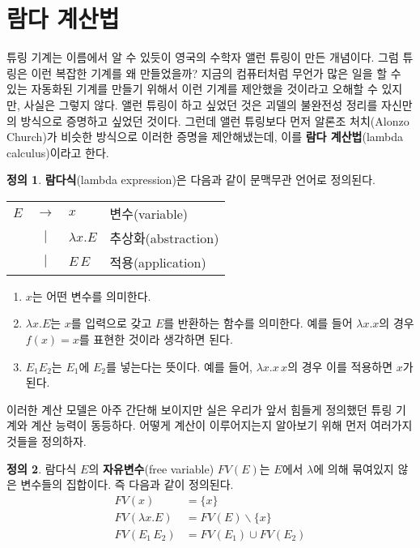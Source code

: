 \documentclass[b5paper, 11pt]{book}
\theoremstyle{definition}
\newtheorem{defn}{정의}[chapter]
\begin{document}
\section{람다 계산법}\label{lambda calculus}
튜링 기계는 이름에서 알 수 있듯이 영국의 수학자 앨런 튜링이 만든 개념이다. 그럼 튜링은 이런 복잡한 기계를 왜 만들었을까? 지금의 컴퓨터처럼 무언가 많은 일을 할 수 있는 자동화된 기계를 만들기 위해서 이런 기계를 제안했을 것이라고 오해할 수 있지만, 사실은 그렇지 않다. 앨런 튜링이 하고 싶었던 것은 괴델의 불완전성 정리를 자신만의 방식으로 증명하고 싶었던 것이다. 그런데 앨런 튜링보다 먼저 알론조 처치(Alonzo Church)가 비슷한 방식으로 이러한 증명을 제안해냈는데, 이를 \textbf{람다 계산법}(lambda calculus)이라고 한다. 
\begin{defn}
    \textbf{람다식}(lambda expression)은 다음과 같이 문맥무관 언어로 정의된다.
    \begin{center}
        \begin{tabular}{ccll}
            $E$ & $\rightarrow$ & $x$ & 변수(variable) \\ 
            & $\vert$ & $\lambda x . E$ & 추상화(abstraction) \\ 
            & $\vert$ & $E \, E$ & 적용(application)
        \end{tabular}    
    \end{center}
    \begin{enumerate}
        \item $x$는 어떤 변수를 의미한다.
        \item $\lambda x. E$는 $x$를 입력으로 갖고 $E$를 반환하는 함수를 의미한다. 예를 들어
        $\lambda x . x$의 경우 $f(x) = x$를 표현한 것이라 생각하면 된다.
        \item $E_1 E_2$는 $E_1$에 $E_2$를 넣는다는 뜻이다. 예를 들어, $\lambda x. x \, x$의 경우
        이를 적용하면 $x$가 된다.
    \end{enumerate} 
\end{defn}
이러한 계산 모델은 아주 간단해 보이지만 실은 우리가 앞서 힘들게 정의했던 튜링 기계와 계산 능력이 동등하다. 어떻게 계산이 이루어지는지 알아보기 위해 먼저 여러가지 것들을 정의하자.
\begin{defn}
    람다식 $E$의 \textbf{자유변수}(free variable) $FV(E)$는 $E$에서 $\lambda$에 의해 묶여있지 않은 변수들의 집합이다. 즉 다음과 같이 정의된다.
    \begin{align*}
        FV(x) &= \{ x \} \\ 
        FV(\lambda x. E) &= FV(E) \backslash \{x\} \\ 
        FV(E_1 \, E_2) &= FV(E_1) \cup FV(E_2) 
    \end{align*}
\end{defn}
\end{document}

